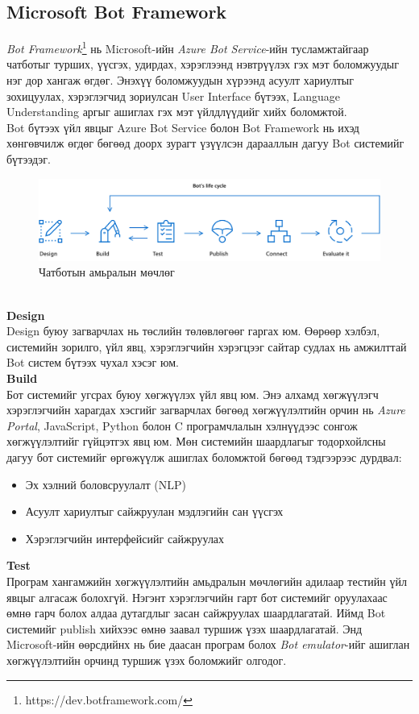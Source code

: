 \subsection{Microsoft Bot Framework}
\textit{Bot Framework}\footnote{https://dev.botframework.com/} нь Microsoft-ийн \textit{Azure Bot Service}-ийн тусламжтайгаар чатботыг турших, үүсгэх, удирдах, хэрэглээнд нэвтрүүлэх гэх мэт боломжуудыг нэг дор хангаж өгдөг. Энэхүү боломжуудын хүрээнд асуулт хариултыг зохицуулах, хэрэглэгчид зориулсан User Interface бүтээх, Language Understanding аргыг ашиглах гэх мэт үйлдлүүдийг хийх боломжтой.
\\Bot бүтээх үйл явцыг Azure Bot Service болон Bot Framework нь ихэд хөнгөвчилж өгдөг бөгөөд доорх зурагт үзүүлсэн дарааллын дагуу Bot системийг бүтээдэг.
\begin{figure}[ht]
  \includegraphics[width=\textwidth]{images/azureSteps.png}
  \caption{Чатботын амьралын мөчлөг}\label{fig:lifeCycle}
\end{figure}
\\\textbf{Design}
\\Design буюу загварчлах нь төслийн төлөвлөгөөг гаргах юм. Өөрөөр хэлбэл, системийн зорилго, үйл явц, хэрэглэгчийн хэрэгцээг сайтар судлах нь амжилттай Bot систем бүтээх чухал хэсэг юм.
\\\textbf{Build}
\\Бот системийг угсрах буюу хөгжүүлэх үйл явц юм. Энэ алхамд хөгжүүлэгч хэрэглэгчийн харагдах хэсгийг загварчлах бөгөөд хөгжүүлэлтийн орчин нь \textit{Azure Portal}, JavaScript, Python болон C програмчлалын хэлнүүдээс сонгож хөгжүүлэлтийг гүйцэтгэх явц юм. Мөн системийн шаардлагыг тодорхойлсны дагуу бот системийг өргөжүүлж ашиглах боломжтой бөгөөд тэдгээрээс дурдвал:
\begin{itemize}
  \item Эх хэлний боловсруулалт (NLP)
  \item Асуулт хариултыг сайжруулан мэдлэгийн сан үүсгэх
  \item Хэрэглэгчийн интерфейсийг сайжруулах
\end{itemize}
\textbf{Test}
\\Програм хангамжийн хөгжүүлэлтийн амьдралын мөчлөгийн адилаар тестийн үйл явцыг алгасаж болохгүй. Нэгэнт хэрэглэгчийн гарт бот системийг оруулахаас өмнө гарч болох алдаа дутагдлыг засан сайжруулах шаардлагатай.  Иймд Bot системийг publish хийхээс өмнө заавал туршиж үзэх шаардлагатай. Энд Microsoft-ийн өөрсдийнх нь бие даасан програм болох \textit{Bot emulator}-ийг ашиглан хөгжүүлэлтийн орчинд туршиж үзэх боломжийг олгодог. 

